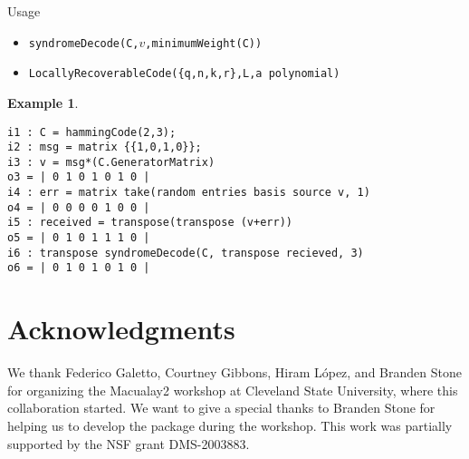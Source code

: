 \documentclass[12pt]{amsart}
\theoremstyle{plain}
\newtheorem{example}[theorem]{Example}
\begin{document}
\medskip

Usage

\medskip

\begin{itemize}
\item {\tt syndromeDecode(C,$v$,minimumWeight(C))}
\item {\tt LocallyRecoverableCode(\{q,n,k,r\},L,a polynomial)}
\end{itemize}

\medskip


\begin{example}
$\,$
\begin{verbatim}
i1 : C = hammingCode(2,3);
i2 : msg = matrix {{1,0,1,0}};
i3 : v = msg*(C.GeneratorMatrix)
o3 = | 0 1 0 1 0 1 0 |
i4 : err = matrix take(random entries basis source v, 1)
o4 = | 0 0 0 0 1 0 0 |
i5 : received = transpose(transpose (v+err))
o5 = | 0 1 0 1 1 1 0 |
i6 : transpose syndromeDecode(C, transpose recieved, 3)
o6 = | 0 1 0 1 0 1 0 |
\end{verbatim}
\end{example}


\section*{Acknowledgments}
We thank Federico Galetto, Courtney Gibbons, Hiram L\'opez, and Branden Stone for organizing the Macualay2 workshop at Cleveland State University, where this collaboration started. We want to give a special thanks to Branden Stone for helping us to develop the package during the workshop. This work was partially supported by the NSF grant DMS-2003883.
\end{document}
